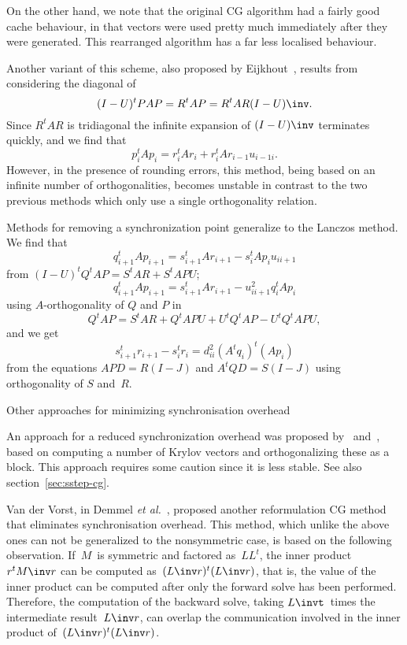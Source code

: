\documentclass[11pt]{artikel3}
\begin{document}
\begin{Outline}
On the other hand, we note that the original CG algorithm had a fairly
good cache behaviour, in that vectors were used pretty much
immediately after they were generated. This rearranged algorithm has a
far less localised behaviour.

Another variant of this scheme, also proposed by Eijkhout~\cite{Eij:lawn51},
results from considering the diagonal of
\[ (I-U)^tPAP = R^tAP = R^tAR(I-U)\inv.\]
Since $R^tAR$ is tridiagonal the infinite expansion of $(I-U)\inv$
terminates quickly, and we find that
\[ p_i^tAp_i = r_i^tAr_i + r_i^tAr_{i-1}u_{i-1i}.\]
However, in the presence of rounding errors, this method, being based
on an infinite number of orthogonalities, becomes unstable in contrast
to the two previous methods which only use a single orthogonality
relation.

\begin{comment}
The number of inner products can be reduced to one by observing
(from the diagonal of $R^tAR=R^tR(I-J)D^{-1}(I-U)$) that
\[ r_{i+1}^tAr_{i+1}=r_{i+1}^tr_{i+1}(1+d_{ii}^{-1}u_{ii+1}); \]
if $u_{ii+1}$ is computed as $r_{i+1}^tr_{i+1}/r_i^tr_i$ then only the
$r_i^tr_i$ inner products need to be computed explicitly.
\end{comment}

Methods for removing a synchronization point generalize to
the Lanczos method. We find that
\[ q_{i+1}^tAp_{i+1}=s_{i+1}^tAr_{i+1}-s_i^tAp_iu_{ii+1} \]
from $(I-U)^tQ^tAP=S^tAR+S^tAPU$;
\[ q_{i+1}^tAp_{i+1}=s_{i+1}^tAr_{i+1}-u_{ii+1}^2q_i^tAp_i \]
using $A$-orthogonality of $Q$ and $P$ in
\[ Q^tAP=S^tAR+Q^tAPU+U^tQ^tAP-U^tQ^tAPU, \]
and we get
\[ s_{i+1}^tr_{i+1}-s_i^tr_i=d_{ii}^2(A^tq_i)^t(Ap_i) \]
from the equations $APD=R(I-J)$ and $A^tQD=S(I-J)$ using orthogonality
of $S$ and~$R$.

 {Other approaches for minimizing synchronisation overhead}
\label{sec:hide-dotprod}

An approach for a  reduced synchronization overhead was proposed
by~\cite{VRo:innerproduct} and~\cite{ChGe:sstep}, based on computing
a number of Krylov vectors and orthogonalizing these as a block.
This approach requires some caution since it is less stable.
See also section~\ref{sec:sstep-cg}.

Van der Vorst, in Demmel {\it et al.}~\cite{dehevo92:acta}, proposed another
reformulation CG method that eliminates synchronisation overhead. This
method, which unlike the above ones can not be generalized to the
nonsymmetric case, is based on the following observation. If~$M$~is
symmetric and factored as~$LL^t$, the inner product~$r^tM\inv r$ can
be computed as~$(L\inv r)^t(L\inv r)$, that is, the value of the inner
product can be computed after only the forward solve has been
performed. Therefore, the computation of the backward solve, taking
$L\invt$~times the intermediate result~$L\inv r$, can overlap the
communication involved in the inner product of~$(L\inv r)^t(L\inv
r)$. 


\end{Outline}
\end{document}
